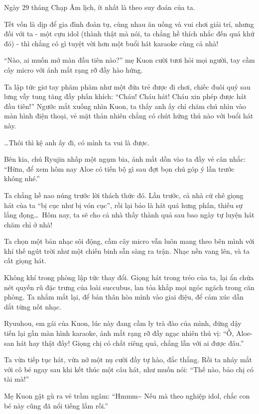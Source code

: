 \documentclass[../main.tex]{subfiles}
\begin{document}
Ngày 29 tháng Chạp Âm lịch, ít nhất là theo suy đoán của ta.

Tết vốn là dịp để gia đình đoàn tụ, cùng nhau ăn uống và vui chơi giải trí, nhưng đối với ta - một cựu idol (thành thật mà nói, ta chẳng hề thích nhắc đến quá khứ đó) - thì chẳng có gì tuyệt vời hơn một buổi hát karaoke cùng cả nhà!

``Nào, ai muốn mở màn đầu tiên nào?'' mẹ Kuon cười tươi hỏi mọi người, tay cầm cây micro với ánh mắt rạng rỡ đầy hào hứng.

Ta lập tức giơ tay phăm phăm như một đứa trẻ được đi chơi, chiếc đuôi quỷ sau lưng vẫy tung tăng đầy phấn khích: ``Cháu! Cháu hát! Cháu xin phép được hát đầu tiên!'' Ngước mắt xuống nhìn Kuon, ta thấy anh ấy chỉ chăm chú nhìn vào màn hình điện thoại, vẻ mặt thản nhiên chẳng có chút hứng thú nào với buổi hát này. 

\dots Thôi thì kệ anh ấy đi, có mình ta vui là được.

Bên kia, chú Ryujin nhấp một ngụm bia, ánh mắt dồn vào ta đầy vẻ cân nhắc: ``Hừm, để xem hôm nay Aloe có tiến bộ gì sau đợt bọn chú góp ý lần trước không nhé.''

Ta chẳng hề nao núng trước lời thách thức đó. Lần trước, cả nhà cứ chê giọng hát của ta ``bị cục như bị vón cục'', rồi lại bảo là hát quá hưng phấn, thiếu sự lắng đọng\dots\ Hôm nay, ta sẽ cho cả nhà thấy thành quả sau bao ngày tự luyện hát chăm chỉ ở nhà!

Ta chọn một bản nhạc sôi động, cầm cây micro vẫn luôn mang theo bên mình với khí thế ngút trời như một chiến binh sẵn sàng ra trận. Nhạc nền vang lên, và ta cất giọng hát.

Không khí trong phòng lập tức thay đổi. Giọng hát trong trẻo của ta, lại ẩn chứa nét quyến rũ đặc trưng của loài succubus, lan tỏa khắp mọi ngóc ngách trong căn phòng. Ta nhắm mắt lại, để bản thân hòa mình vào giai điệu, để cảm xúc dẫn dắt từng nốt nhạc.

Ryuuhou, em gái của Kuon, lúc này đang cầm ly trà đào của mình, đứng dậy tiến lại gần màn hình karaoke, ánh mắt rạng rỡ đầy ngạc nhiên thú vị: ``Ồ, Aloe-san hát hay thật đấy! Giọng chị có chất riêng quá, chẳng lẫn với ai được đâu.''

Ta vừa tiếp tục hát, vừa nở một nụ cười đầy tự hào, đắc thắng. Rồi ta nháy mắt với cô bé ngay sau khi kết thúc một câu hát, như muốn nói: ``Thế nào, bảo chị có tài mà!''

Mẹ Kuon gật gù ra vẻ trầm ngâm: ``Hmmm\~{} Nếu mà theo nghiệp idol, chắc con bé này cũng đã nổi tiếng lắm rồi.''
\end{document}
